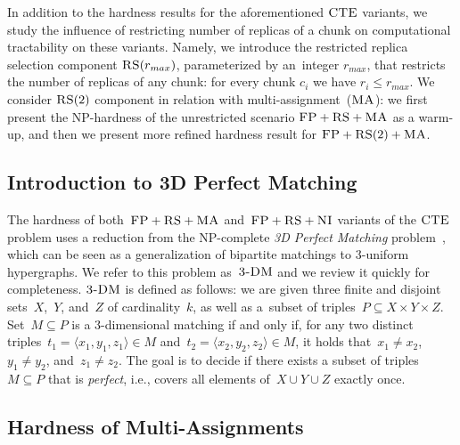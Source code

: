In addition to the hardness results for the aforementioned $\textsc{CTE}$ variants, we study the influence of restricting number of replicas of a chunk on computational tractability on these variants.
Namely, we introduce the restricted replica selection component $\textsc{RS}(r_{max})$, parameterized by an~integer $r_{max}$, that restricts the number of replicas of any chunk: for every chunk $c_i$ we have $r_i \leq r_{max}$.
We consider $\textsc{RS}(2)$ component in relation with multi-assignment~($\textsc{MA}$): we first present the NP-hardness of the unrestricted scenario $\textsc{FP}+\textsc{RS}+\textsc{MA}$ as a warm-up,
and then we present more refined hardness result for ${\textsc{FP}+\textsc{RS}(2)+\textsc{MA}}$.

\subsection{Introduction to 3D Perfect Matching}
\label{sec:3dm_intro}

The hardness of both~$\textsc{FP}+\textsc{RS}+\textsc{MA}$ and~$\textsc{FP}+\textsc{RS}+\textsc{NI}$ variants of the $\textsc{CTE}$ problem uses a reduction
from the NP-complete \emph{3D Perfect Matching} problem~\cite{3dmatch},
which can be seen as a generalization of bipartite matchings to 3-uniform
hypergraphs. We refer to this problem as~$\textsc{3-DM}$ and we
review it quickly for completeness.
$\textsc{3-DM}$ is defined as follows: we are given three finite and disjoint
sets~$X$,~$Y$, and~$Z$ of cardinality~$k$, as well as a~subset of triples~$P\subseteq
X \times Y \times Z$.  Set~$M \subseteq P$ is a 3-dimensional matching
if and only if, for any two distinct triples~$t_1=\langle x_1, y_1, z_1\rangle \in M$
and~$t_2= \langle x_2, y_2, z_2 \rangle \in M$, it holds that~$x_1\neq x_2$,~$y_1\neq
y_2$, and~$z_1\neq z_2$. The goal is to decide if there exists
a subset of triples $M \subseteq P$ that is \emph{perfect}, i.e., covers all
elements of~$X \cup Y \cup Z$ exactly once.


\subsection{Hardness of Multi-Assignments}\label{ssec:fprsma}


